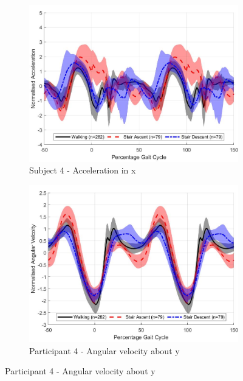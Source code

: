 \documentclass[sensors,article,submit,moreauthors,pdftex]{Definitions/mdpi}
\begin{document}
\begin{figure}[!htb]
     \centering
     \begin{subfigure}[b]{0.49\textwidth}
         \centering
         \includegraphics[width=\textwidth]{Figures/accel_x_trend_Participant_04.jpg}
         \caption{Subject 4 - Acceleration in x}
         \label{subfig:x_accel_subj_4}
     \end{subfigure}
     \hfill
     \begin{subfigure}[b]{0.49\textwidth}
         \centering
         \includegraphics[width=\textwidth]{Figures/gyro_y_trend_Participant_04.jpg}
         \caption{Participant 4 - Angular velocity about y}
         \label{subfig:x_gyro_subj_4}
     \end{subfigure}

\end{figure}
\end{document}
